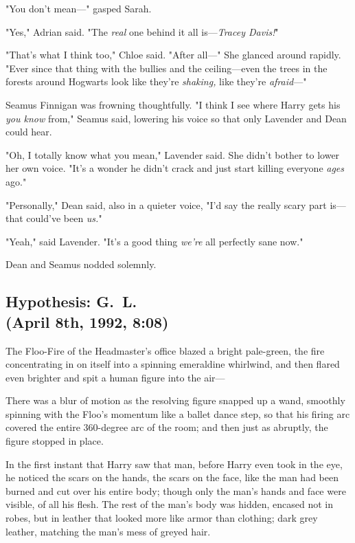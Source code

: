 "You don't mean—" gasped Sarah.

"Yes," Adrian said. "The \emph{real} one behind it all is—\emph{Tracey
Davis!}"

"That's what I think too," Chloe said. "After all—" She glanced around
rapidly. "Ever since that thing with the bullies and the ceiling—even the
trees in the forests around Hogwarts look like they're \emph{shaking,} like
they're \emph{afraid}—"

Seamus Finnigan was frowning thoughtfully. "I think I see where Harry gets
his{\el} \emph{you know{\el}} from," Seamus said, lowering his voice so
that only Lavender and Dean could hear.

"Oh, I totally know what you mean," Lavender said. She didn't bother to lower
her own voice. "It's a wonder he didn't crack and just start killing everyone
\emph{ages} ago."

"Personally," Dean said, also in a quieter voice, "I'd say the really scary
part is—that could've been \emph{us.}"

"Yeah," said Lavender. "It's a good thing \emph{we're} all perfectly sane now."

Dean and Seamus nodded solemnly.
\sbreak
\vspace{-2\baselineskip}
\subsection{Hypothesis: G.~L.\\
(April 8th, 1992, 8:08\PM)}

The Floo-Fire of the Headmaster's office blazed a bright pale-green, the fire
concentrating in on itself into a spinning emeraldine whirlwind, and then
flared even brighter and spit a human figure into the air—

There was a blur of motion as the resolving figure snapped up a wand, smoothly
spinning with the Floo's momentum like a ballet dance step, so that his firing
arc covered the entire 360-degree arc of the room; and then just as abruptly,
the figure stopped in place.

In the first instant that Harry saw that man, before Harry even took in the
eye, he noticed the scars on the hands, the scars on the face, like the man had
been burned and cut over his entire body; though only the man's hands and face
were visible, of all his flesh. The rest of the man's body was hidden, encased
not in robes, but in leather that looked more like armor than clothing; dark
grey leather, matching the man's mess of greyed hair.

